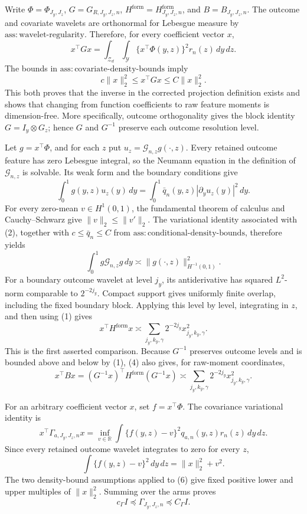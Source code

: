 Write \(\Phi=\Phi_{J_y,J_z}\), \(G=G_{R,J_y,J_z,n}\), \(H^{\mathrm{form}}=H^{\mathrm{form}}_{J_y,J_z,n}\), and \(B=B_{J_y,J_z,n}\).  The outcome and covariate wavelets are orthonormal for Lebesgue measure by \(\mathrm{ass{:}wavelet\text{-}regularity}\).  Therefore, for every coefficient vector \(x\),
\[
x^{\top}Gx=\int_{\mathcal Z_d}\int_{\mathcal Y}\{x^{\top}\Phi(y,z)\}^2r_n(z)\,dy\,dz.
\]
The bounds in \(\mathrm{ass{:}covariate\text{-}density\text{-}bounds}\) imply
\[
c\|x\|_2^2\le x^{\top}Gx\le C\|x\|_2^2.                                  \tag{1}
\]
This both proves that the inverse in the corrected projection definition exists and shows that changing from function coefficients to raw feature moments is dimension-free.  More specifically, outcome orthogonality gives the block identity \(G=I_y\otimes G_z\); hence \(G\) and \(G^{-1}\) preserve each outcome resolution level.

Let \(g=x^{\top}\Phi\), and for each \(z\) put \(u_z=\mathcal G_{n,z}g(\cdot,z)\).  Every retained outcome feature has zero Lebesgue integral, so the Neumann equation in the definition of \(\mathcal G_{n,z}\) is solvable.  Its weak form and the boundary conditions give
\[
\int_0^1g(y,z)u_z(y)\,dy
=\int_0^1\bar q_n(y,z)|\partial_yu_z(y)|^2\,dy.                           \tag{2}
\]
For every zero-mean \(v\in H^1(0,1)\), the fundamental theorem of calculus and Cauchy--Schwarz give \(\|v\|_2\le\|v'\|_2\).  The variational identity associated with (2), together with \(c\le\bar q_n\le C\) from \(\mathrm{ass{:}conditional\text{-}density\text{-}bounds}\), therefore yields
\[
\int_0^1g\mathcal G_{n,z}g\,dy\asymp\|g(\cdot,z)\|_{H^{-1}(0,1)}^2.       \tag{3}
\]
For a boundary outcome wavelet at level \(j_y\), its antiderivative has squared \(L^2\)-norm comparable to \(2^{-2j_y}\).  Compact support gives uniformly finite overlap, including the fixed boundary block.  Applying this level by level, integrating in \(z\), and then using (1) gives
\[
x^{\top}H^{\mathrm{form}}x
\asymp\sum_{j_y,k_y,\gamma}2^{-2j_y}x_{j_y,k_y,\gamma}^2.                 \tag{4}
\]
This is the first asserted comparison.  Because \(G^{-1}\) preserves outcome levels and is bounded above and below by (1), (4) also gives, for raw-moment coordinates,
\[
x^{\top}Bx
= (G^{-1}x)^{\top}H^{\mathrm{form}}(G^{-1}x)
\asymp\sum_{j_y,k_y,\gamma}2^{-2j_y}x_{j_y,k_y,\gamma}^2.                 \tag{5}
\]

For an arbitrary coefficient vector \(x\), set \(f=x^{\top}\Phi\).  The covariance variational identity is
\[
x^{\top}\Gamma_{a,J_y,J_z,n}x
=\inf_{v\in\mathbb R}\int\{f(y,z)-v\}^2q_{a,n}(y,z)r_n(z)\,dy\,dz.      \tag{6}
\]
Since every retained outcome wavelet integrates to zero for every \(z\),
\[
\int\{f(y,z)-v\}^2\,dy\,dz=\|x\|_2^2+v^2.
\]
The two density-bound assumptions applied to (6) give fixed positive lower and upper multiples of \(\|x\|_2^2\).  Summing over the arms proves
\[
c_\Gamma I\preceq\Gamma_{J_y,J_z,n}\preceq C_\Gamma I.                 \tag{7}
\]

